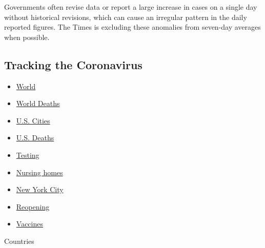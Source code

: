 Governments often revise data or report a large increase in cases on a
single day without historical revisions, which can cause an irregular
pattern in the daily reported figures. The Times is excluding these
anomalies from seven-day averages when possible.

\hypertarget{tracking-the-coronavirus}{%
\subsection{Tracking the Coronavirus}\label{tracking-the-coronavirus}}

\begin{itemize}
\tightlist
\item
  \href{https://www.nytimes3xbfgragh.onion/interactive/2020/world/coronavirus-maps.html}{World}
\item
  \href{https://www.nytimes3xbfgragh.onion/interactive/2020/04/21/world/coronavirus-missing-deaths.html}{World
  Deaths}
\item
  \href{https://www.nytimes3xbfgragh.onion/interactive/2020/04/23/upshot/five-ways-to-monitor-coronavirus-outbreak-us.html}{U.S.
  Cities}
\item
  \href{https://www.nytimes3xbfgragh.onion/interactive/2020/05/05/us/coronavirus-death-toll-us.html}{U.S.
  Deaths}
\item
  \href{https://www.nytimes3xbfgragh.onion/interactive/2020/us/coronavirus-testing.html}{Testing}
\item
  \href{https://www.nytimes3xbfgragh.onion/interactive/2020/us/coronavirus-nursing-homes.html}{Nursing
  homes}
\item
  \href{https://www.nytimes3xbfgragh.onion/interactive/2020/nyregion/new-york-city-coronavirus-cases.html}{New
  York City}
\item
  \href{https://www.nytimes3xbfgragh.onion/interactive/2020/us/states-reopen-map-coronavirus.html}{Reopening}
\item
  \href{https://www.nytimes3xbfgragh.onion/interactive/2020/science/coronavirus-vaccine-tracker.html}{Vaccines}
\end{itemize}

Countries


